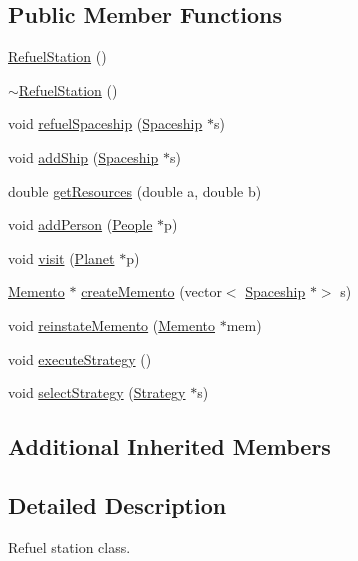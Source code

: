 \subsection*{Public Member Functions}
\begin{DoxyCompactItemize}
\item 
\hyperlink{classRefuelStation_a3ab9b746bd1e7bfaa9eff06567d6a1d4}{Refuel\+Station} ()
\item 
\hyperlink{classRefuelStation_afc0ebc020ef08d8a6a2096bdb2f3e314}{$\sim$\+Refuel\+Station} ()
\item 
void \hyperlink{classRefuelStation_a1b14f9c75c883e3288c52a32b2bbd8a4}{refuel\+Spaceship} (\hyperlink{classSpaceship}{Spaceship} $\ast$s)
\item 
void \hyperlink{classRefuelStation_a03510ee8365b5095ca80fac0c5a0a780}{add\+Ship} (\hyperlink{classSpaceship}{Spaceship} $\ast$s)
\item 
double \hyperlink{classRefuelStation_a69c7e7aca14ba70f4d2c4c11e43b4bb4}{get\+Resources} (double a, double b)
\item 
void \hyperlink{classRefuelStation_a6bd40214cf5dc4d46739943f545c6d7a}{add\+Person} (\hyperlink{classPeople}{People} $\ast$p)
\item 
void \hyperlink{classRefuelStation_ae87ea232171fbb09e14b2da82ae3af56}{visit} (\hyperlink{classPlanet}{Planet} $\ast$p)
\item 
\hyperlink{classMemento}{Memento} $\ast$ \hyperlink{classRefuelStation_abd79d981cc7650d6417b8c8166a3fb85}{create\+Memento} (vector$<$ \hyperlink{classSpaceship}{Spaceship} $\ast$$>$ s)
\item 
void \hyperlink{classRefuelStation_aa984ee5ed5a4cea0b96ba1c3903a1b1c}{reinstate\+Memento} (\hyperlink{classMemento}{Memento} $\ast$mem)
\item 
void \hyperlink{classRefuelStation_aa8fccc0887cac98193803762533f9ab1}{execute\+Strategy} ()
\item 
void \hyperlink{classRefuelStation_a1dfda37915eca25344aa2fdeaacab4b4}{select\+Strategy} (\hyperlink{classStrategy}{Strategy} $\ast$s)
\end{DoxyCompactItemize}
\subsection*{Additional Inherited Members}


\subsection{Detailed Description}
Refuel station class. 

